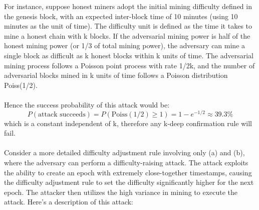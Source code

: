 \documentclass{report}
\begin{document}
For instance, suppose honest miners adopt the initial mining difficulty defined in the genesis block, with an expected inter-block time of 10 minutes (using 10 minutes as the unit of time). The difficulty unit is defined as the time it takes to mine a honest chain with k blocks. If the adversarial mining power is half of the honest mining power (or 1/3 of total mining power), the adversary can mine a single block as difficult as k honest blocks within k units of time. The adversarial mining process follows a Poisson point process with rate 1/2k, and the number of adversarial blocks mined in k units of time follows a Poisson distribution Poiss(1/2).\\\\
Hence the success probability of this attack would be:\\
\begin{equation*}
	P(\text{attack succeeds}) = P(\text{Poiss}(1/2) \geq 1) = 1 - e^{-1/2} \approx 39.3\%
\end{equation*}
which is a constant independent of k, therefore any k-deep confirmation rule will fail.\\\\
Consider a more detailed difficulty adjustment rule involving only (a) and (b), where the adversary can perform a difficulty-raising attack. The attack exploits the ability to create an epoch with extremely close-together timestamps, causing the difficulty adjustment rule to set the difficulty significantly higher for the next epoch. The attacker then utilizes the high variance in mining to execute the attack. Here's a description of this attack:
\end{document}
